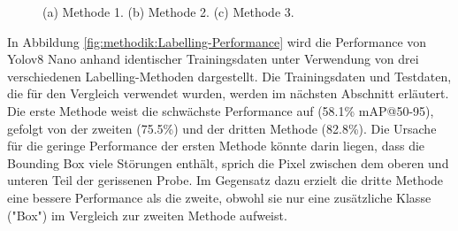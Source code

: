     \begin{figure}[htbp]
        \centering
    
        \caption[Drei Labeling-Methoden.]{(a) Methode 1. (b) Methode 2. (c) Methode 3.}
        \label{fig:methodik:Labelling-Methods}
    \end{figure}

    In Abbildung \ref{fig:methodik:Labelling-Performance} wird die Performance von Yolov8 Nano anhand identischer Trainingsdaten unter Verwendung von drei verschiedenen Labelling-Methoden dargestellt. Die Trainingsdaten und Testdaten, die für den Vergleich verwendet wurden, werden im nächsten Abschnitt erläutert. Die erste Methode weist die schwächste Performance auf (58.1\% mAP@50-95), gefolgt von der zweiten (75.5\%) und der dritten Methode (82.8\%). Die Ursache für die geringe Performance der ersten Methode könnte darin liegen, dass die Bounding Box viele Störungen enthält, sprich die Pixel zwischen dem oberen und unteren Teil der gerissenen Probe. Im Gegensatz dazu erzielt die dritte Methode eine bessere Performance als die zweite, obwohl sie nur eine zusätzliche Klasse ("Box") im Vergleich zur zweiten Methode aufweist.

